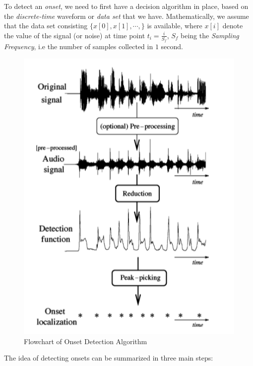 \documentclass[10pt]{article}
\begin{document}
\qquad To detect an \textit{onset}, we need to first have a decision algorithm in place, based on the \textit{discrete-time} waveform or \textit{data set} that we have. Mathematically, we assume that the data set consisting $\{ x[0] , x[1] , \cdots, \}$ is available, where $x[i]$ denote the value of the signal (or noise) at time point $t_i=\frac{i}{S_f}$, $S_f$ being the \textit{Sampling Frequency}, i.e the number of samples collected in $1$ second.

\begin{figure}
    \centering
    \includegraphics{onset_detection_flowchart.png}
    \caption{Flowchart of Onset Detection Algorithm}
    \label{fig:onset-flowchart}
\end{figure}


The idea of detecting onsets can be summarized in three main steps:
\end{document}
